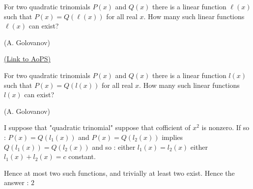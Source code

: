 \begin{problem}
	For two quadratic trinomials $P(x)$ and $Q(x)$ there is a linear function $\ell(x)$ such that $P(x)=Q(\ell(x))$ for all real $x$. How many such linear functions $\ell(x)$ can exist?

\begin{italicized}(A. Golovanov)\end{italicized}
	\flushright \href{https://artofproblemsolving.com/community/c6h597517}{(Link to AoPS)}
\end{problem}



\begin{solution}
	\begin{tcolorbox}For two quadratic trinomials $P(x)$ and $Q(x)$ there is a linear function $l(x)$ such that $P(x)=Q(l(x))$ for all real $x$. How many such linear functions $l(x)$ can exist?

\begin{italicized}(A. Golovanov)\end{italicized}\end{tcolorbox}
I suppose that "quadratic trinomial" suppose that cofficient of $x^2$ is nonzero. If so :
$P(x)=Q(l_1(x))$ and $P(x)=Q(l_2(x))$ implies $Q(l_1(x))=Q(l_2(x))$ and so :
either $l_1(x)=l_2(x)$
either $l_1(x)+l_2(x)=c$ constant.

Hence at most two such functions, and trivially at least two exist. Hence the answer : $\boxed{2}$
\end{solution}



